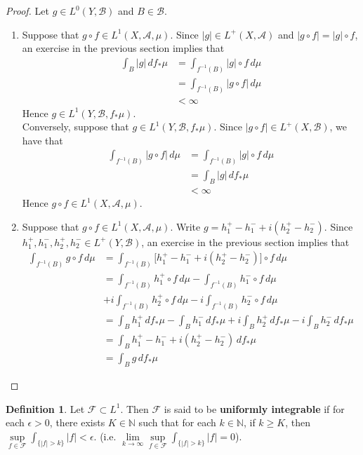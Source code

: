 \documentclass{book}
\theoremstyle{definition}
\newtheorem{defn}[definition]{Definition}
\newcommand{\ep}{\epsilon}
\newcommand{\N}{\mathbb{N}}
\newcommand{\MA}{\mathcal{A}}
\newcommand{\MB}{\mathcal{B}}
\newcommand{\MF}{\mathcal{F}}
\newcommand{\ld}[1]{\label{defn:#1}}
\DeclareMathOperator*{\0}{\mbf{0}}
\DeclareMathOperator*{\1}{\mbf{1}}
\newcommand{\dmu}{\, d \mu}
\begin{document}
	\begin{proof} Let $g \in L^0(Y, \MB)$ and $B \in \MB$.
		\begin{enumerate}
			\item Suppose that $g \circ f \in L^1(X, \MA, \mu)$. Since $|g| \in L^+(X, \MA)$ and $|g \circ f| = |g| \circ f$, an exercise in the previous section implies that 
			\begin{align*}
				\int_B |g|  \, d f_*\mu  
				& = \int_{f^{-1}(B)} |g| \circ f \dmu \\
				& = \int_{f^{-1}(B)} |g \circ f| \dmu \\
				& < \infty 
			\end{align*}
			Hence $g \in L^1(Y, \MB, f_*\mu)$. \\
			Conversely, suppose that $g \in L^1(Y, \MB, f_*\mu)$. Since $|g \circ f| \in L^+(X, \MB)$, we have that 
			\begin{align*}
				\int_{f^{-1}(B)} |g \circ f| \dmu   
				& = \int_{f^{-1}(B)} |g| \circ f \dmu \\
				& = \int_B |g|  \, d f_*\mu \\
				& < \infty 
			\end{align*}
			Hence $g \circ f \in L^1(X, \MA, \mu)$. \\
			\item Suppose that $g \circ f \in L^1(X, \MA, \mu)$. Write $g = h_1^+ - h_1^- + i(h_2^+ - h_2^-)$. Since $h_1^+, h_1^-, h_2^+, h_2^- \in L^+(Y, \MB)$, an exercise in the previous section implies that 
			\begin{align*}
				\int_{f^{-1}(B)} g \circ f \dmu
				& = \int_{f^{-1}(B)} \bigg[ h_1^+ - h_1^- + i(h_2^+ - h_2^-) \bigg] \circ f \dmu \\
				& = \int_{f^{-1}(B)}  h_1^+ \circ f \dmu - \int_{f^{-1}(B)}  h_1^- \circ f \dmu \\
				& + i \int_{f^{-1}(B)} h_2^+ \circ f \dmu -i \int_{f^{-1}(B)}  h_2^- \circ f \dmu \\
				& = \int_B h_1^+ \, d f_*\mu - \int_B h_1^- \, d f_*\mu + i \int_B h_2^+ \, d f_*\mu - i \int_B h_2^- \, d f_*\mu \\
				& = \int_B  h_1^+ - h_1^- + i(h_2^+ - h_2^-)  \, d f_*\mu \\
				& = \int_B g \, d f_*\mu
			\end{align*}
		\end{enumerate}
	\end{proof}
	
	\begin{defn} \ld{00000} 
		Let $\MF \subset L^1$. Then $\MF$ is said to be \textbf{uniformly integrable} if for each $\ep >0$, there exists $K \in \N$ such that for each $k \in \N$, if $k \geq K$, then $\sup\limits_{f \in \MF} \int_{\{|f|>k\}}|f| < \ep$. (i.e. $\lim\limits_{k \rightarrow \infty} \sup\limits_{f \in \MF} \int_{\{|f| > k\}} |f| = 0$).
	\end{defn}
	
\end{document}
